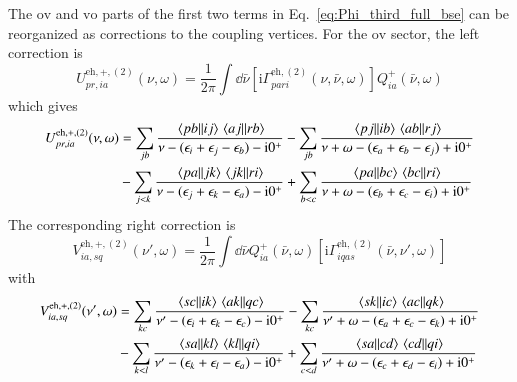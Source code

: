 \documentclass[aip,jcp,reprint,noshowkeys,superscriptaddress]{revtex4-1}
\newcommand{\eps}{\epsilon}
\newcommand{\ii}{\mathrm{i}}
\newcommand{\eh}{\text{eh}}
\begin{document}
The $\text{ov}$ and $\text{vo}$ parts of the first two terms in
Eq.~\eqref{eq:Phi_third_full_bse} can be reorganized as corrections to
the coupling vertices.
For the $\text{ov}$ sector, the left correction is
\begin{equation}
    U^{\eh,+,(2)}_{pr,ia}(\nu,\omega)
    =
    \frac{1}{2\pi}
    \int\dd{\bar\nu}
    \left[
    \ii\Gamma^{\eh,(2)}_{pari}(\nu,\bar\nu,\omega)
    \right]
    Q^+_{ia}(\bar\nu,\omega)
    \label{eq:U_eh_second_def}
\end{equation}
which gives
\begin{equation}
    \begin{split}
    U^{\eh,+,(2)}_{pr,ia}(\nu,\omega)
    & =
    \sum_{jb}
    \frac{\mel{pb}{}{ij}\mel{aj}{}{rb}}
    {\nu-(\eps_i+\eps_j-\eps_b)-\ii0^+}
    -
    \sum_{jb}
    \frac{\mel{pj}{}{ib}\mel{ab}{}{rj}}
    {\nu+\omega-(\eps_a+\eps_b-\eps_j)+\ii0^+}
    \\
    &-
    \sum_{j<k}
    \frac{\mel{pa}{}{jk}\mel{jk}{}{ri}}
    {\nu-(\eps_j+\eps_k-\eps_a)-\ii0^+}
    +
    \sum_{b<c}
    \frac{\mel{pa}{}{bc}\mel{bc}{}{ri}}
    {\nu+\omega-(\eps_b+\eps_c-\eps_i)+\ii0^+}
    \end{split}
    \label{eq:U_eh_second_explicit}
\end{equation}
The corresponding right correction is
\begin{equation}
    V^{\eh,+,(2)}_{ia,sq}(\nu',\omega)
    =
    \frac{1}{2\pi}
    \int\dd{\bar\nu}
    Q^+_{ia}(\bar\nu,\omega)
    \left[
    \ii\Gamma^{\eh,(2)}_{iqas}(\bar\nu,\nu',\omega)
    \right]
    \label{eq:V_eh_second_def}
\end{equation}
with
\begin{equation}
    \begin{split}
    V^{\eh,+,(2)}_{ia,sq}(\nu',\omega)
    & =
    \sum_{kc}
    \frac{\mel{sc}{}{ik}\mel{ak}{}{qc}}
    {\nu'-(\eps_i+\eps_k-\eps_c)-\ii0^+}
    -
    \sum_{kc}
    \frac{\mel{sk}{}{ic}\mel{ac}{}{qk}}
    {\nu'+\omega-(\eps_a+\eps_c-\eps_k)+\ii0^+}
    \\
    &-
    \sum_{k<l}
    \frac{\mel{sa}{}{kl}\mel{kl}{}{qi}}
    {\nu'-(\eps_k+\eps_l-\eps_a)-\ii0^+}
    +
    \sum_{c<d}
    \frac{\mel{sa}{}{cd}\mel{cd}{}{qi}}
    {\nu'+\omega-(\eps_c+\eps_d-\eps_i)+\ii0^+}
    \end{split}
    \label{eq:V_eh_second_explicit}
\end{equation}
\end{document}
